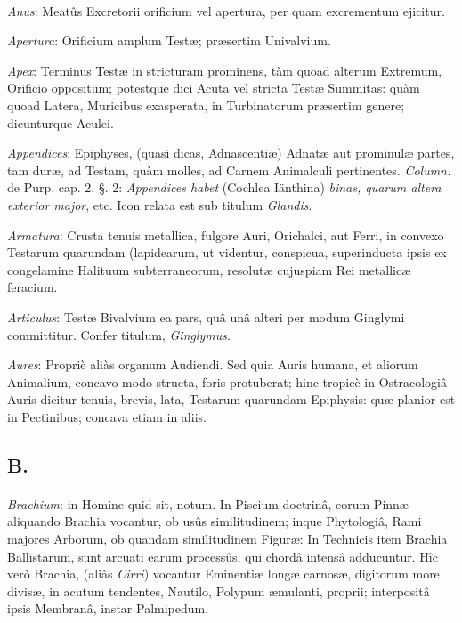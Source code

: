 \documentclass[a4paper, 11pt, oneside, polutonikogreek, german]{article}
\begin{document}
\paragraph{}
\emph{Anus}: Meatûs Excretorii orificium vel apertura, per quam excrementum ejicitur.

\emph{Apertura}: Orificium amplum Testæ; præsertim Univalvium.

\emph{Apex}: Terminus Testæ in stricturam prominens, tàm quoad alterum Extremum, Orificio oppositum; potestque dici Acuta vel stricta Testæ Summitas: quàm quoad Latera, Muricibus exasperata, in Turbinatorum præsertim genere; dicunturque Aculei.

\emph{Appendices}: Epiphyses, (quasi dicas, Adnascentiæ) Adnatæ aut prominulæ partes, tam duræ, ad Testam, quàm molles, ad Carnem Animalculi pertinentes. \emph{Column.} de Purp. cap. 2. §. 2: \emph{Appendices habet} (Cochlea Iänthina) \emph{binas, quarum altera exterior major}, etc. Icon relata est sub titulum \emph{Glandis}.

\emph{Armatura}: Crusta tenuis metallica, fulgore Auri, Orichalci, aut Ferri, in convexo Testarum quarundam (lapidearum, ut videntur, conspicua, superinducta ipsis ex congelamine Halituum subterraneorum, resolutæ cujuspiam Rei metallicæ feracium.

\emph{Articulus}: Testæ Bivalvium ea pars, quâ unâ alteri per modum Ginglymi committitur. Confer titulum, \emph{Ginglymus}.

\emph{Aures}: Propriè aliàs organum Audiendi. Sed quia Auris humana, et aliorum Animalium, concavo modo structa, foris protuberat; hinc tropicè in Ostracologiâ Auris dicitur tenuis, brevis, lata, Testarum quarundam Epiphysis: quæ planior est in Pectinibus; concava etiam in aliis.

\subsection{B.}
\paragraph{}
\emph{Brachium}: in Homine quid sit, notum. In Piscium doctrinâ, eorum Pinnæ aliquando Brachia vocantur, ob usûs similitudinem; inque Phytologiâ, Rami majores Arborum, ob quandam similitudinem Figuræ: In Technicis item Brachia Ballistarum, sunt arcuati earum processûs, qui chordâ intensâ adducuntur. Hîc verò Brachia, (aliàs \emph{Cirri}) vocantur Eminentiæ longæ carnosæ, digitorum more divisæ, in acutum tendentes, Nautilo, Polypum æmulanti, proprii; interpositâ ipsis Membranâ, instar Palmipedum.
\end{document}
